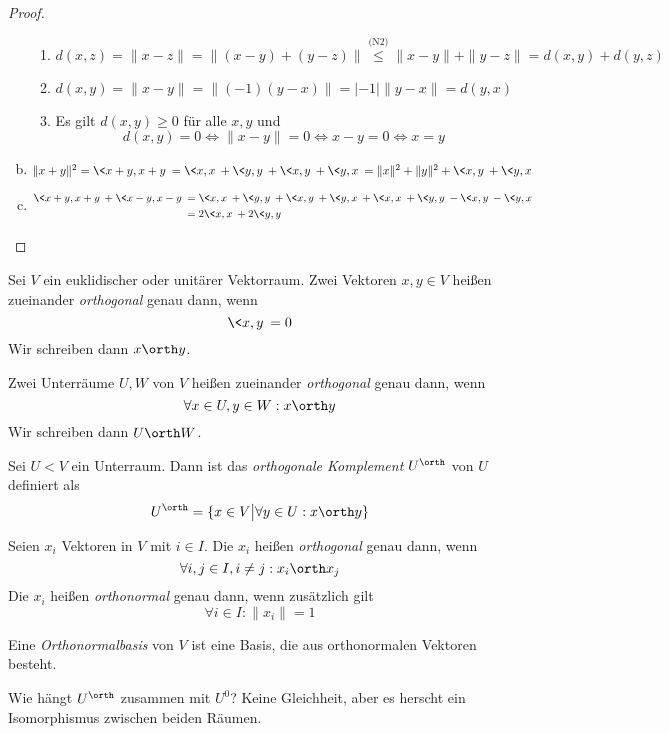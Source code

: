\documentclass{mycourse}
\begin{document}
\begin{thm}
\begin{proof}
\begin{enumerate}[(a)]
				\begin{enumerate}[({M}1)]
					\item
						$
							d(x,z) = \|x-z\| = \|(x-y)+(y-z)\| \stackrel{\text{(N2)}}\le \|x-y\| + \|y-z\| = d(x,y) + d(y,z)
						$
					\item
						$
							d(x,y) = \|x-y\| = \|(-1)(y-x)\| = |-1|\|y-x\| = d(y,x)
						$
					\item
						Es gilt $d(x,y) \ge 0$ für alle $x,y$ und
						\[
							d(x,y) = 0 \iff \|x-y\| = 0 \iff x-y = 0 \iff x=y
						\]
				\end{enumerate}
			\item
				$
					\|x+y\|^2 = \<x+y,x+y\> = \<x,x\> + \<y,y\> + \<x,y\> + \<y,x\> = \|x\|^2 + \|y\|^2 + \<x,y\> + \<y,x\>
				$				
			\item
				\begin{align*}
					\<x+y,x+y\> + \<x-y,x-y\> &= \<x,x\> + \<y,y\> + \<x,y\> + \<y,x\> + \<x,x\> + \<y,y\> - \<x,y\> -\<y,x\>\\
											  &= 2\<x,x\> + 2\<y,y\>
				\end{align*}
		\end{enumerate}
	\end{proof}
\end{thm}

\begin{df}[Orthogonalität]
	\label{df:13.7}
	Sei $V$ ein euklidischer oder unitärer Vektorraum.
	Zwei Vektoren $x,y\in V$ heißen zueinander \emph{orthogonal} genau dann, wenn
	\[
		\<x,y\> = 0
	\]
	Wir schreiben dann $x \orth y$.

	Zwei Unterräume $U,W$ von $V$ heißen zueinander \emph{orthogonal} genau dann, wenn
	\[
		\forall x\in U, y\in W : x \orth y
	\]
	Wir schreiben dann $U \orth W$.

	Sei $U<V$ ein Unterraum.
	Dann ist das \emph{orthogonale Komplement} $U^\orth$ von $U$ definiert als
	\[
		U^\orth = \{ x\in V \big| \forall y\in U: x\orth y\}
	\]

	Seien $x_i$ Vektoren in $V$ mit $i\in I$.
	Die $x_i$ heißen \emph{orthogonal} genau dann, wenn
	\[
		\forall i,j\in I, i\neq j : x_i \orth x_j
	\]
	Die $x_i$ heißen \emph{orthonormal} genau dann, wenn zusätzlich gilt
	\[
		\forall i\in I: \|x_i\| = 1
	\]

	Eine \emph{Orthonormalbasis} von $V$ ist eine Basis, die aus orthonormalen Vektoren besteht.
\end{df}

\begin{note}
	Wie hängt $U^\orth$ zusammen mit $U^0$?
	Keine Gleichheit, aber es herscht ein Isomorphismus zwischen beiden Räumen.
\end{note}
\end{document}
